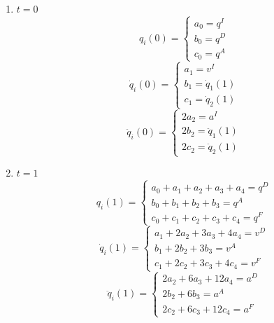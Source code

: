 \documentclass[a4paper,14pt]{extreport}
\begin{document}
	\begin{enumerate}
		\item $t = 0$
	\begin{equation*}
		q_i(0) = 
		\begin{cases}
		a_0 = q^I \\
		b_0 = q^D \\
		c_0 = q^A
		\end{cases}
	\end{equation*}		
	\begin{equation*}
		\dot q_i(0) = 
		\begin{cases}
		a_1 = v^I \\
		b_1 = \dot q_1(1) \\
		c_1 = \dot q_2(1)
		\end{cases}
	\end{equation*}	
	\begin{equation*}
		\ddot q_i(0) = 
		\begin{cases}
		2 a_2 = a^I \\
		2 b_2 = \ddot q_1(1)\\
		2 c_2 = \ddot q_2(1)
		\end{cases}
	\end{equation*}	

		\item $t = 1$
	\begin{equation*}
		q_i(1) = 
		\begin{cases}
		a_0 + a_1 + a_2 + a_3  + a_4 = q^D\\
		b_0 + b_1 + b_2 + b_3 = q^A \\
		c_0 + c_1 + c_2  + c_3 + c_4 = q^F 
		\end{cases}
	\end{equation*}	
	\begin{equation*}
		\dot q_i(1) = 
		\begin{cases}
		a_1 + 2 a_2 + 3 a_3  + 4 a_4 = v^D\\
		b_1 + 2 b_2 + 3 b_3 = v^A \\
		c_1 + 2 c_2 + 3 c_3 + 4 c_4 = v^F 
		\end{cases}
	\end{equation*}	
	\begin{equation*}
		\ddot q_i(1) = 
		\begin{cases}
		2 a_2 + 6 a_3  + 12 a_4 = a^D\\
		2 b_2 + 6 b_3 = a^A \\
		2 c_2 + 6 c_3 + 12 c_4 = a^F 
		\end{cases}
	\end{equation*}	
	\end{enumerate}
\end{document}

